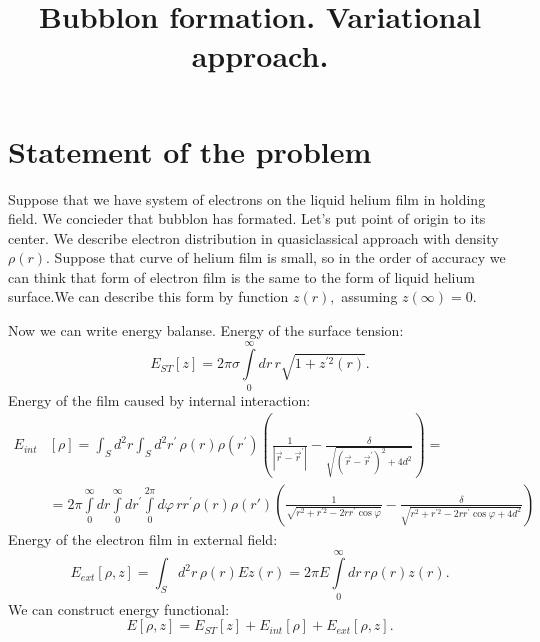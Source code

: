 \documentclass[10pt]{article}
\title{Bubblon formation. Variational approach.}
\author{}
\begin{document}



\section{Statement of the problem}

Suppose that we have system of electrons on the liquid helium film in holding field.
We concieder that bubblon has formated.
Let's put point of origin to its center.
We describe electron distribution in quasiclassical approach with density $\rho(r).$
Suppose that curve of helium film is small, so in the order of accuracy we can think that form of electron film is the same to the form of liquid helium surface.We can describe this form by function $z(r),$ assuming $z(\infty)=0.$ 

Now we can write energy balanse. Energy of the surface tension:
\begin{equation}
  E_{ST} [z] = 2 \pi \sigma \int\limits_0^\infty dr \, r \sqrt{1+z^{\prime 2} (r)}.
\end{equation}
Energy of the film caused by internal interaction:
\begin{equation}
  \begin{aligned}
    E_{int}& [\rho] = \int_S d^2 r \int_S d^2 r^{\prime} \, \rho(r) \rho(r^{\prime}) \left( \frac{1}{|\vec{r} - \vec{r}^{\prime}|} - \frac{ \delta }{ \sqrt{ \left( \vec{r} - \vec{r}^{\prime} \right)^2 + 4 d^2 } } \right) = \\
    &{} = 2 \pi \int\limits_0^\infty dr \int\limits_0^\infty dr^{\prime} \int\limits_0^{2\pi} d\varphi \, r r^{\prime} \rho(r) \rho(r') \left( \frac{1}{ \sqrt{r^2 + r^{\prime 2} - 2 r r^{\prime} \cos \varphi}} - \frac{\delta}{ \sqrt{ r^2 + r^{\prime 2} - 2 r r^{\prime} \cos \varphi + 4 d^2 } } \right)
  \end{aligned}
\end{equation}
Energy of the electron film in external field:
\begin{equation}
  E_{ext} [\rho,z] = \int_S d^2 r \, \rho(r) E z(r) = 2 \pi E \int\limits_0^\infty dr \, r \rho(r) z(r).
\end{equation}
We can construct energy functional:
\begin{equation}
  E[\rho,z] = E_{ST}[z] + E_{int}[\rho] + E_{ext}[\rho,z].
\end{equation}
\end{document}

